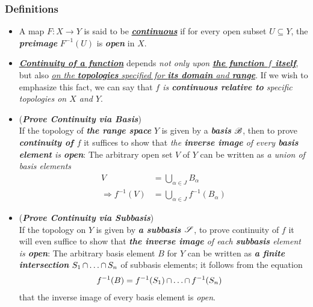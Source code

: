 \documentclass[11pt]{article}
\begin{document}
\subsubsection{Definitions}
\begin{itemize}
\item \begin{definition}
A map $F: X \rightarrow Y$ is said to be \underline{\emph{\textbf{continuous}}} if for every open subset $U \subseteq Y$, the \emph{\textbf{preimage}} $F^{-1}(U)$ is \emph{\textbf{open}} in $X$.
\end{definition}

\item \begin{remark}
\underline{\emph{\textbf{Continuity of a function}}} depends \emph{not only upon \underline{\textbf{the function $f$ itself}}}, but also \underline{\emph{on the \textbf{topologies} specified for \textbf{its domain} and \textbf{range}}}. If we wish to emphasize this fact, we can say that \emph{$f$ is \textbf{continuous relative to} specific topologies on $X$ and $Y$}.
\end{remark}

\item \begin{remark} (\emph{\textbf{Prove Continuity via Basis}})\\
If the topology of \emph{\textbf{the range space}} $Y$ is given by a \emph{\textbf{basis}} ${\mathscr B}$, then to prove \emph{\textbf{continuity of $f$}} it suffices to show that \emph{the \textbf{inverse image} of every \textbf{basis element} is \textbf{open}}: The arbitrary open set $V$ of $Y$ can be written as \emph{a union of basis elements}
\begin{align*}
V &= \bigcup_{\alpha \in J}B_{\alpha}\\
\Rightarrow f^{-1}(V) &= \bigcup_{\alpha \in J}f^{-1}(B_{\alpha})
\end{align*}
\end{remark}

\item \begin{remark} (\emph{\textbf{Prove Continuity via Subbasis}})\\
If the topology on $Y$ is given by \emph{\textbf{a subbasis ${\mathscr S}$}}, to prove continuity of $f$ it will even suffice to show that \emph{\textbf{the inverse image} of each \textbf{subbasis} element is \textbf{open}}: The arbitrary basis element $B$ for $Y$ can be written as \emph{\textbf{a finite intersection}} $S_1 \,{\cap}\ldots{\cap}\, S_{n}$ of subbasis elements; it follows from the equation
\begin{align*}
f^{-1}(B) &= f^{-1}(S_1) \,{\cap}\ldots{\cap}\, f^{-1}(S_n)
\end{align*}
that the inverse image of every basis element is \emph{open}.
\end{remark}



\end{itemize}
\end{document}
